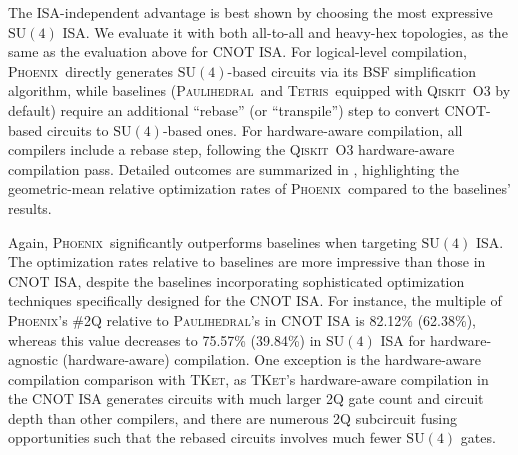 \documentclass[conference,9pt]{IEEEtran}
\newcommand{\dquote}[1]{``#1''}
\newcommand{\phoenix}{\textsc{Phoenix}}
\newcommand{\qiskit}{\textsc{Qiskit}}
\newcommand{\tket}{\textsc{TKet}}
\newcommand{\tetris}{\textsc{Tetris}}
\newcommand{\paulihedral}{\textsc{Paulihedral}}
\newcommand{\CNOT}{\mathrm{CNOT}}
\newcommand{\SUfour}{\mathrm{SU}(4)}
\begin{document}
    The ISA-independent advantage is best shown by choosing the most expressive $\SUfour$ ISA. We evaluate it with both all-to-all and heavy-hex topologies, as the same as the evaluation above for $\CNOT$ ISA. For logical-level compilation, \phoenix\ directly generates $ \SUfour $-based circuits via its BSF simplification algorithm, while baselines (\paulihedral\ and \tetris\ equipped with \qiskit\ O3 by default) require an additional \dquote{rebase} (or \dquote{transpile}) step to convert $ \CNOT $-based circuits to $ \SUfour $-based ones. For hardware-aware compilation, all compilers include a rebase step, following the \qiskit\ O3 hardware-aware compilation pass. Detailed outcomes are summarized in , highlighting the geometric-mean relative optimization rates of \phoenix\ compared to the baselines' results.

    Again, \phoenix\ significantly outperforms baselines when targeting $ \SUfour $ ISA. The optimization rates relative to baselines are more impressive than those in $ \CNOT $ ISA, despite the baselines incorporating sophisticated optimization techniques specifically designed for the $ \CNOT $ ISA. For instance, the multiple of \phoenix's \#2Q relative to \paulihedral's in $ \CNOT $ ISA is 82.12\% (62.38\%), whereas this value decreases to 75.57\% (39.84\%) in $ \SUfour $ ISA for hardware-agnostic (hardware-aware) compilation. One exception is the hardware-aware compilation comparison with \tket, as \tket's hardware-aware compilation in the $ \CNOT $ ISA generates circuits with much larger 2Q gate count and circuit depth than other compilers, and there are numerous 2Q subcircuit fusing opportunities such that the rebased circuits involves much fewer $ \SUfour $ gates.
\end{document}
